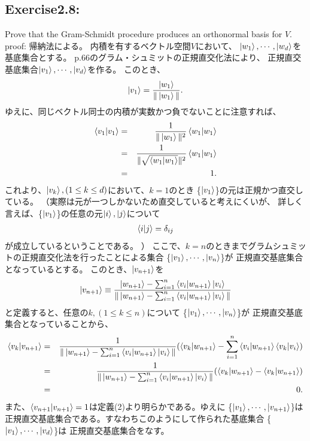 \setcounter{equation}{0}
\begin{flushleft}
\section{\Large Exercise2.8:} Prove that the Gram-Schmidt procedure produces an orthonormal basis for $V$.
\newline
{\large proof:}
帰納法による。
内積を有するベクトル空間$V$において、
$\ket{w_1}, \cdots, \ket{w_d}$を基底集合とする。
p.66のグラム・シュミットの正規直交化法により、
正規直交基底集合$\ket{v_1}, \cdots, \ket{v_d}$を作る。
このとき、
\begin{eqnarray}
\ket{v_1} = \frac{\ket{w_1}}{\|\ket{w_1}\|}.
\end{eqnarray}
ゆえに、同じベクトル同士の内積が実数かつ負でないことに注意すれば、
\begin{eqnarray*}
\braket{v_1|v_1} &=& \frac{1}{\|\ket{w_1}\|^2}\braket{w_1|w_1}\\
&=& \frac{1}{\|\sqrt{\braket{w_1|w_1}}\|^2}\braket{w_1|w_1}\\
&=& 1.
\end{eqnarray*}
これより、$\ket{v_k},(1\leq k\leq d)$において、$k = 1$のとき 
\{$\ket{v_1}$\}の元は正規かつ直交している。
（実際は元が一つしかないため直交していると考えにくいが、
詳しく言えば、\{$\ket{v_1}$\}の任意の元$\ket{i}, \ket{j}$について
\begin{eqnarray*}
\braket{i|j} = \delta_{ij}
\end{eqnarray*}
が成立しているということである。
）
\newline
ここで、$k = n$のときまでグラムシュミットの正規直交化法を行ったことによる集合
\{$\ket{v_1}, \cdots, \ket{v_{n}}$\}が
正規直交基底集合となっているとする。
このとき、$\ket{v_{n+1}}$を
\begin{eqnarray}
\ket{v_{n+1}} \equiv \frac{\ket{w_{n+1}} - 
\sum_{i=1}^n\braket{v_i|w_{n+1}}\ket{v_i}}
{\|\ket{w_{n+1}} - 
\sum_{i=1}^n\braket{v_i|w_{n+1}}\ket{v_i}\|}
\end{eqnarray}
と定義すると、任意の$k, (1\leq k\leq n)$について
\{$\ket{v_1}, \cdots, \ket{v_{n}}$\}が
正規直交基底集合となっていることから、
\begin{eqnarray*}
\braket{v_k|v_{n+1}} &=& \frac{1}{\|\ket{w_{n+1}} - 
\sum_{i=1}^n\braket{v_i|w_{n+1}}\ket{v_i}\|}
(\braket{v_k|w_{n+1}} - 
\sum_{i=1}^n\braket{v_i|w_{n+1}}\braket{v_k|v_i})\\
&=& \frac{1}{\|\ket{w_{n+1}} - 
\sum_{i=1}^n\braket{v_i|w_{n+1}}\ket{v_i}\|}
(\braket{v_k|w_{n+1}} - \braket{v_k|w_{n+1}})\\
&=& 0.
\end{eqnarray*}
また、$\braket{v_{n+1}|v_{n+1}} = 1$は定義(2)より明らかである。ゆえに
\{$\ket{v_1}, \cdots, \ket{v_{n+1}}$\}は
正規直交基底集合である。すなわちこのようにして作られた基底集合
\{$\ket{v_1}, \cdots, \ket{v_{d}}$\}は
正規直交基底集合をなす。
\end{flushleft}
